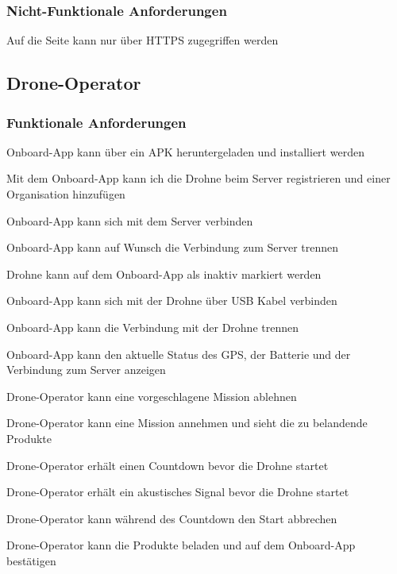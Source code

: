 \subsubsection{Nicht-Funktionale Anforderungen}
\begin{todolist}
	\item Auf die Seite kann nur über HTTPS zugegriffen werden
\end{todolist}

\subsection{Drone-Operator}
\subsubsection{Funktionale Anforderungen}
\begin{todolist}
	\item Onboard-App kann über ein APK heruntergeladen und installiert werden
	\item[\done] Mit dem Onboard-App kann ich die Drohne beim Server registrieren und einer Organisation hinzufügen
	\item[\done] Onboard-App kann sich mit dem Server verbinden
	\item Onboard-App kann auf Wunsch die Verbindung zum Server trennen
	\item Drohne kann auf dem Onboard-App als inaktiv markiert werden
	\item[\done] Onboard-App kann sich mit der Drohne über USB Kabel verbinden
	\item[\done] Onboard-App kann die Verbindung mit der Drohne trennen
	\item Onboard-App kann den aktuelle Status des GPS, der Batterie und der Verbindung zum Server anzeigen
	\item Drone-Operator kann eine vorgeschlagene Mission ablehnen
	\item Drone-Operator kann eine Mission annehmen und sieht die zu belandende Produkte
	\item Drone-Operator erhält einen Countdown bevor die Drohne startet
	\item Drone-Operator erhält ein akustisches Signal bevor die Drohne startet
	\item Drone-Operator kann während des Countdown den Start abbrechen
	\item Drone-Operator kann die Produkte beladen und auf dem Onboard-App bestätigen
\end{todolist}

